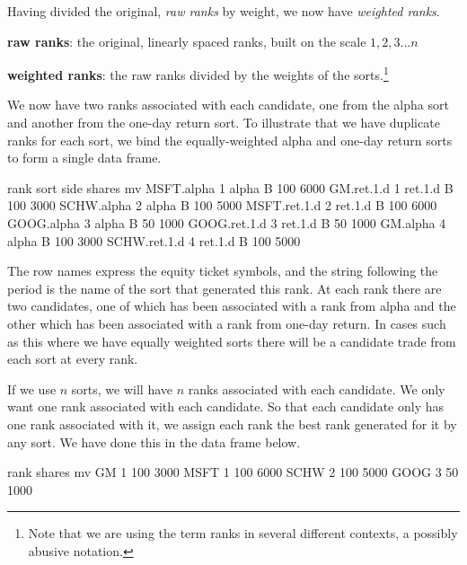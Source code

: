 \documentclass{article}
\begin{document}
Having divided the original, \emph{raw ranks} by weight, we now have
\emph{weighted ranks}.

\begin{description}

\item{\bf{raw ranks}}: the original, linearly spaced ranks, built on
  the scale $1, 2, 3\dots{}n$

\item{\bf{weighted ranks}}: the raw ranks divided by the weights of
  the sorts.\protect\footnote{Note that we are using the term ranks in
  several different contexts, a possibly abusive notation.}

\end{description}

We now have two ranks associated with each candidate, one from the
alpha sort and another from the one-day return sort.  To illustrate
that we have duplicate ranks for each sort, we bind the
equally-weighted alpha and one-day return sorts to form a single data
frame.

\begin{Schunk}
\begin{Soutput}
             rank    sort side shares   mv
MSFT.alpha      1   alpha    B    100 6000
GM.ret.1.d      1 ret.1.d    B    100 3000
SCHW.alpha      2   alpha    B    100 5000
MSFT.ret.1.d    2 ret.1.d    B    100 6000
GOOG.alpha      3   alpha    B     50 1000
GOOG.ret.1.d    3 ret.1.d    B     50 1000
GM.alpha        4   alpha    B    100 3000
SCHW.ret.1.d    4 ret.1.d    B    100 5000
\end{Soutput}
\end{Schunk}

The row names express the equity ticket symbols, and the string
following the period is the name of the sort that generated this rank.
At each rank there are two candidates, one of which has been
associated with a rank from alpha and the other which has been
associated with a rank from one-day return.  In cases such as this
where we have equally weighted sorts there will be a candidate trade
from each sort at every rank.

If we use $n$ sorts, we will have $n$ ranks associated with each
candidate.  We only want one rank associated with each candidate.  So
that each candidate only has one rank associated with it, we assign
each rank the best rank generated for it by any sort.  We have done
this in the data frame below.


\begin{Schunk}
\begin{Soutput}
     rank shares   mv
GM      1    100 3000
MSFT    1    100 6000
SCHW    2    100 5000
GOOG    3     50 1000
\end{Soutput}
\end{Schunk}
\end{document}
